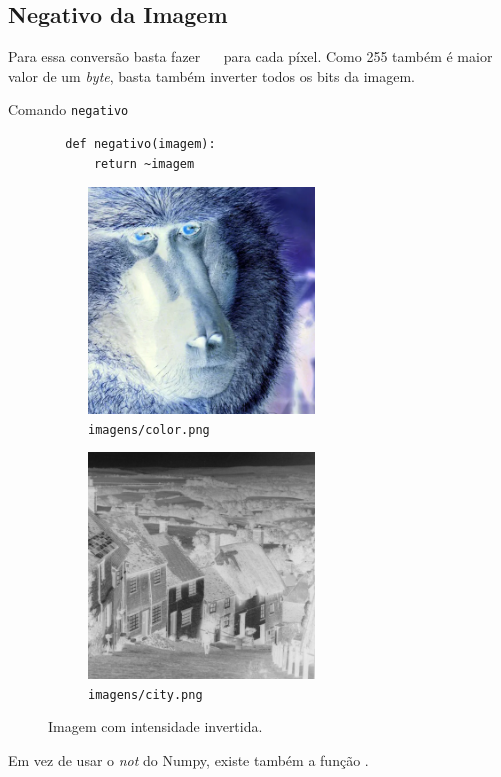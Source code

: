 \subsection{Negativo da Imagem}

Para essa conversão basta fazer ~~ para cada píxel. Como 255 também é maior valor de um \textit{byte}, basta também inverter todos os bits da imagem.

\begin{listing}[h]
    \caption{Comando \texttt{negativo}}

    \begin{verbatim}
        def negativo(imagem):
            return ~imagem
    \end{verbatim}
\end{listing}

\begin{figure}[h]
    \centering
    \begin{subfigure}{0.45\textwidth}
        \centering
        \includegraphics[width=6cm]{resultados/colorneg.png}
        \caption{\texttt{imagens/color.png}}
    \end{subfigure}%
    \begin{subfigure}{0.45\textwidth}
        \centering
        \includegraphics[width=6cm]{resultados/cityneg.png}
        \caption{\texttt{imagens/city.png}}
    \end{subfigure}

    \caption{Imagem com intensidade invertida.}
\end{figure}

Em vez de usar o \textit{not} do Numpy, existe também a função  \autocite{ref:bitwise_not}.
